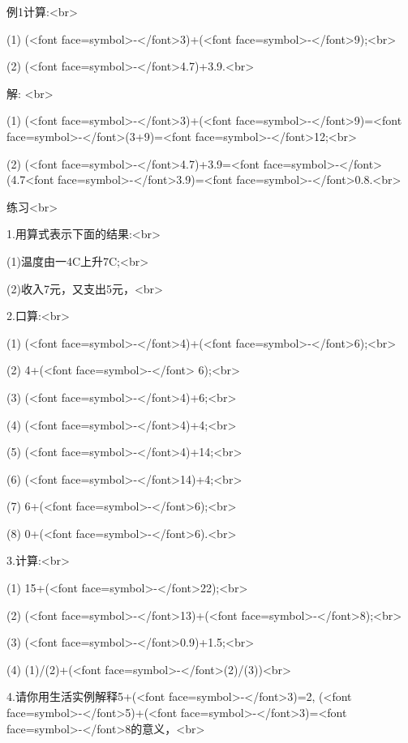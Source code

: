     例1计算:<br>

    
    (1) (<font face=symbol>-</font>3)+(<font face=symbol>-</font>9);<br>

    
    (2) (<font face=symbol>-</font>4.7)+3.9.<br>

    
    解: <br>

    (1) (<font face=symbol>-</font>3)+(<font face=symbol>-</font>9)=<font face=symbol>-</font>(3+9)=<font face=symbol>-</font>12;<br>


    (2) (<font face=symbol>-</font>4.7)+3.9=<font face=symbol>-</font>(4.7<font face=symbol>-</font>3.9)=<font face=symbol>-</font>0.8.<br>


\endexample
    
\beginexercise
    
    练习<br>

    
    1.用算式表示下面的结果:<br>

    
    (1)温度由一4C上升7C;<br>

    (2)收入7元，又支出5元，<br>

    
    2.口算:<br>


    (1) (<font face=symbol>-</font>4)+(<font face=symbol>-</font>6);<br>

    
    (2) 4+(<font face=symbol>-</font> 6);<br>

    
    (3) (<font face=symbol>-</font>4)+6;<br>


    (4) (<font face=symbol>-</font>4)+4;<br>

    
    (5) (<font face=symbol>-</font>4)+14;<br>

    
    (6) (<font face=symbol>-</font>14)+4;<br>

    
    (7) 6+(<font face=symbol>-</font>6);<br>


    (8) 0+(<font face=symbol>-</font>6).<br>

    
    
    3.计算:<br>


    (1) 15+(<font face=symbol>-</font>22);<br>

    
    (2) (<font face=symbol>-</font>13)+(<font face=symbol>-</font>8);<br>

    
    (3) (<font face=symbol>-</font>0.9)+1.5;<br>


    (4) (1)/(2)+(<font face=symbol>-</font>(2)/(3))<br>


    4.请你用生活实例解释5+(<font face=symbol>-</font>3)=2, (<font face=symbol>-</font>5)+(<font face=symbol>-</font>3)=<font face=symbol>-</font>8的意义，<br>

